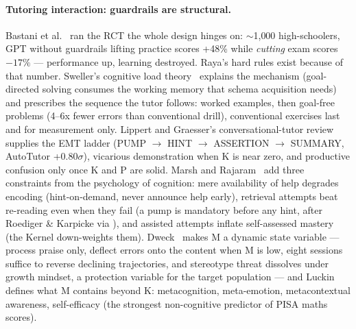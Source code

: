 \documentclass[11pt,a4paper]{article}
\begin{document}
\paragraph{Tutoring interaction: guardrails are structural.} Bastani et
al.~\cite{bastani-2024} ran the RCT the whole design hinges on:
$\sim$1{,}000 high-schoolers, GPT without guardrails lifting practice scores
+48\% while \emph{cutting} exam scores $-17\%$ --- performance up, learning
destroyed. Raya's hard rules exist because of that number. Sweller's
cognitive load theory~\cite{sweller-1988} explains the mechanism
(goal-directed solving consumes the working memory that schema acquisition
needs) and prescribes the sequence the tutor follows: worked examples, then
goal-free problems (4--6x fewer errors than conventional drill),
conventional exercises last and for measurement only. Lippert and Graesser's
conversational-tutor review~\cite{lippert-2020} supplies the EMT ladder
(PUMP $\to$ HINT $\to$ ASSERTION $\to$ SUMMARY, AutoTutor +0.80$\sigma$),
vicarious demonstration when K is near zero, and productive confusion only
once K and P are solid. Marsh and Rajaram~\cite{marsh-2019} add three
constraints from the psychology of cognition: mere availability of help
degrades encoding (hint-on-demand, never announce help early), retrieval
attempts beat re-reading even when they fail (a pump is mandatory before any
hint, after Roediger \& Karpicke via \cite{marsh-2019}), and assisted
attempts inflate self-assessed mastery (the Kernel down-weights them). Dweck~\cite{dweck-2006}
makes M a dynamic state variable --- process praise only, deflect errors onto
the content when M is low, eight sessions suffice to reverse declining
trajectories, and stereotype threat dissolves under growth mindset, a
protection variable for the target population --- and Luckin~\cite{luckin-2018}
defines what M contains beyond K: metacognition, meta-emotion,
metacontextual awareness, self-efficacy (the strongest non-cognitive
predictor of PISA maths scores).
\end{document}
